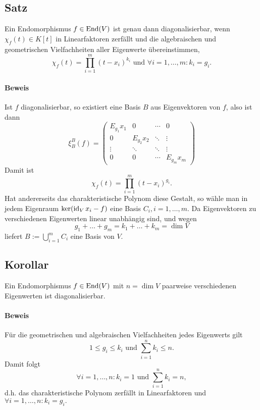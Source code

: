 \subsection{Satz}
    \begin{Satz}
		Ein Endomorphismus $ f\in \operatorname{End}(V) $ ist genau dann diagonalisierbar, wenn $ \chi_f(t) \in K[t] $ in Linearfaktoren zerfällt und die algebraischen und geometrischen Vielfachheiten aller Eigenwerte übereinstimmen,
			\[ \chi_f(t) = \prod_{i=1}^{m}(t-x_i)^{k_i} \text{ und } \forall i=1,\dots,m: k_i = g_i.\]
	\end{Satz}
\paragraph{Beweis}
	Ist $ f $ diagonalisierbar, so existiert eine Basis $ B $ aus Eigenvektoren von $ f $, also ist dann
		\[ \xi_B^B(f) =
			\begin{pmatrix}
				E_{g_1}x_1 &0& \cdots & 0 \\
				0 &E_{g_2}x_2& \ddots & \vdots\\
				\vdots & \ddots& \ddots & \vdots\\
				0 & 0 & \cdots & E_{g_m}x_m 
			\end{pmatrix} \]
	Damit ist
		\[ \chi_f(t)=\prod_{i=1}^{m}(t-x_i)^{g_i}. \]
	Hat andererseits das charakteristische Polynom diese Gestalt, so wähle man in jedem Eigenraum $ \ker(\operatorname{id}_Vx_i-f) $ eine Basis $ C_i,i=1,\dots,m $. Da Eigenvektoren zu verschiedenen Eigenwerten linear unabhängig sind, und wegen
		\[ g_1+\dots+g_m = k_1 + \dots + k_m = \dim V \]
	liefert $ B := \bigcup_{i=1}^mC_i $ eine Basis von $ V $.
\subsection{Korollar}
	\begin{Korollar}
		Ein Endomorphismus $ f\in\operatorname{End}(V) $ mit $ n=\dim V $ paarweise verschiedenen Eigenwerten ist diagonalisierbar.
	\end{Korollar}
\paragraph{Beweis}
	Für die geometrischen und algebraischen Vielfachheiten jedes Eigenwerts gilt
		\[ 1\leq g_i \leq k_i \text{ und } \sum_{i=1}^{n}k_i \leq n. \]
	Damit folgt
		\[ \forall i=1,\dots,n:k_i = 1 \text{ und } \sum_{i=1}^{n}k_i = n, \]
	d.h. das charakteristische Polynom zerfällt in Linearfaktoren und $ \forall i=1,\dots,n:k_i=g_i. $
